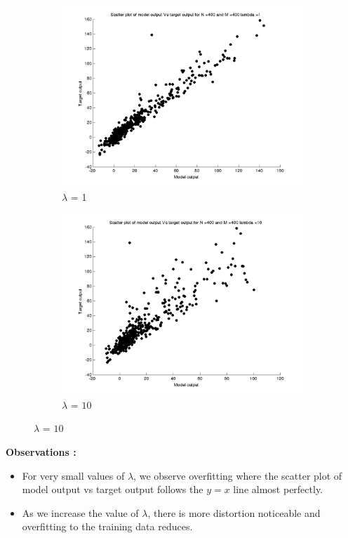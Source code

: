 \documentclass{article}
\begin{document}
\begin{figure}[H]
\begin{subfigure}{.5\textwidth}
\centering
\includegraphics[width=\linewidth]{D2/Scatter/Varyinglambda_N400M400lambda1}
\caption{$\lambda$ = 1}
\end{subfigure}
\begin{subfigure}{.5\textwidth}
\includegraphics[width=\linewidth]{D2/Scatter/Varyinglambda_N400M400lambda10}
\caption{$\lambda$ = $10$}
\end{subfigure}



\end{figure}


\textbf{Observations :}

\begin{itemize}
\item For very small values of $\lambda$, we observe overfitting where the scatter plot of model output vs target output follows the $y=x$ line almost perfectly.
\item As we increase the value of $\lambda$, there is more distortion noticeable and overfitting to the training data reduces.
\end{itemize}
\end{document}

